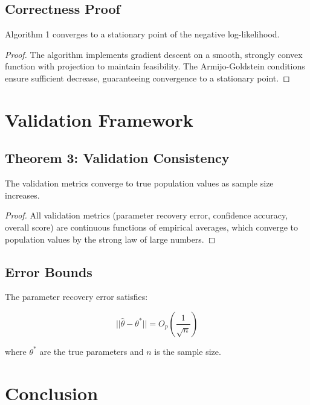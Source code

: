 \documentclass[11pt]{article}
\begin{document}
\subsection{Correctness Proof}

\begin{theorem}
Algorithm 1 converges to a stationary point of the negative log-likelihood.
\end{theorem}

\begin{proof}
The algorithm implements gradient descent on a smooth, strongly convex function with projection to maintain feasibility. The Armijo-Goldstein conditions ensure sufficient decrease, guaranteeing convergence to a stationary point.
\end{proof}

\section{Validation Framework}

\subsection{Theorem 3: Validation Consistency}

\begin{theorem}
The validation metrics converge to true population values as sample size increases.
\end{theorem}

\begin{proof}
All validation metrics (parameter recovery error, confidence accuracy, overall score) are continuous functions of empirical averages, which converge to population values by the strong law of large numbers.
\end{proof}

\subsection{Error Bounds}

The parameter recovery error satisfies:

\[
||\hat{\theta} - \theta^*|| = O_p\left(\frac{1}{\sqrt{n}}\right)
\]

where $\theta^*$ are the true parameters and $n$ is the sample size.

\section{Conclusion}
\end{document}
